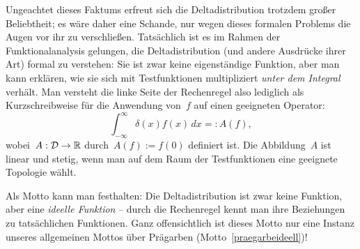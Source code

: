 Ungeachtet dieses Faktums erfreut sich die Deltadistribution trotzdem großer
Beliebtheit; es wäre daher eine Schande, nur wegen dieses formalen Problems die
Augen vor ihr zu verschließen. Tatsächlich ist es im Rahmen der
Funktionalanalysis gelungen, die Deltadistribution (und andere Ausdrücke ihrer
Art) formal zu verstehen: Sie ist zwar keine eigenständige Funktion, aber man
kann erklären, wie sie sich mit Testfunktionen multipliziert \emph{unter dem
Integral} verhält. Man versteht die linke Seite der Rechenregel also lediglich
als Kurzschreibweise für die Anwendung von~$f$ auf einen geeigneten Operator:
\[ \int_{-\infty}^\infty \delta(x) f(x) \,dx =: A(f), \]
wobei~$A : \mathcal{D} \to \mathbb{R}$ durch~$A(f) := f(0)$ definiert ist. Die Abbildung~$A$
ist linear und stetig, wenn man auf dem Raum der Testfunktionen eine geeignete
Topologie wählt.

Als Motto kann man festhalten: Die Deltadistribution ist zwar keine Funktion,
aber eine \emph{ideelle Funktion} -- durch die Rechenregel kennt man ihre
Beziehungen zu tatsächlichen Funktionen. Ganz offensichtlich ist dieses Motto
nur eine Instanz unseres allgemeinen Mottos über Prägarben
(Motto~\ref{praegarbeideell})!


